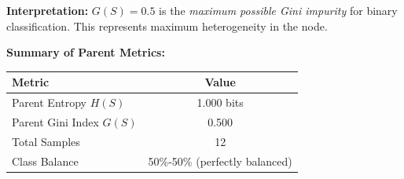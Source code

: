 \documentclass[12pt]{article}
\begin{document}
\begin{solution}
\textbf{Interpretation:} $G(S) = 0.5$ is the \textit{maximum possible Gini impurity} for binary classification. This represents maximum heterogeneity in the node.

\textbf{Summary of Parent Metrics:}

\begin{center}
\begin{tabular}{|l|c|}
\hline
\textbf{Metric} & \textbf{Value} \\
\hline
Parent Entropy $H(S)$ & 1.000 bits \\
Parent Gini Index $G(S)$ & 0.500 \\
Total Samples & 12 \\
Class Balance & 50\%-50\% (perfectly balanced) \\
\hline
\end{tabular}
\end{center}
\end{solution}
\end{document}
